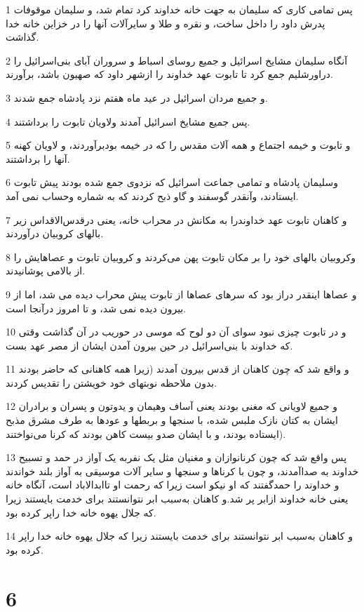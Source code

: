 \par 1 پس تمامی کاری که سلیمان به جهت خانه خداوند کرد تمام شد، و سلیمان موقوفات پدرش داود را داخل ساخت، و نقره و طلا و سایرآلات آنها را در خزاین خانه خدا گذاشت.
\par 2 آنگاه سلیمان مشایخ اسرائیل و جمیع روسای اسباط و سروران آبای بنی‌اسرائیل را دراورشلیم جمع کرد تا تابوت عهد خداوند را ازشهر داود که صهیون باشد، برآورند.
\par 3 و جمیع مردان اسرائیل در عید ماه هفتم نزد پادشاه جمع شدند.
\par 4 پس جمیع مشایخ اسرائیل آمدند ولاویان تابوت را برداشتند.
\par 5 و تابوت و خیمه اجتماع و همه آلات مقدس را که در خیمه بودبرآوردند، و لاویان کهنه آنها را برداشتند.
\par 6 وسلیمان پادشاه و تمامی جماعت اسرائیل که نزدوی جمع شده بودند پیش تابوت ایستادند، وآنقدر گوسفند و گاو ذبح کردند که به شماره وحساب نمی آمد.
\par 7 و کاهنان تابوت عهد خداوندرا به مکانش در محراب خانه، یعنی درقدس‌الاقداس زیر بالهای کروبیان درآوردند.
\par 8 وکروبیان بالهای خود را بر مکان تابوت پهن می‌کردند و کروبیان تابوت و عصاهایش را از بالامی پوشانیدند.
\par 9 و عصاها اینقدر دراز بود که سرهای عصاها از تابوت پیش محراب دیده می شد، اما از بیرون دیده نمی شد، و تا امروز درآنجا است.
\par 10 و در تابوت چیزی نبود سوای آن دو لوح که موسی در حوریب در آن گذاشت وقتی که خداوند با بنی‌اسرائیل در حین بیرون آمدن ایشان از مصر عهد بست.
\par 11 و واقع شد که چون کاهنان از قدس بیرون آمدند (زیرا همه کاهنانی که حاضر بودند بدون ملاحظه نوبتهای خود خویشتن را تقدیس کردند.
\par 12 و جمیع لاویانی که مغنی بودند یعنی آساف وهیمان و یدوتون و پسران و برادران ایشان به کتان نازک ملبس شده، با سنجها و بربطها و عودها به طرف مشرق مذبح ایستاده بودند، و با ایشان صدو بیست کاهن بودند که کرنا می‌نواختند).
\par 13 پس واقع شد که چون کرنانوازان و مغنیان مثل یک نفربه یک آواز در حمد و تسبیح خداوند به صداآمدند، و چون با کرناها و سنجها و سایر آلات موسیقی به آواز بلند خواندند و خداوند را حمدگفتند که او نیکو است زیرا که رحمت او تاابدالاباد است، آنگاه خانه یعنی خانه خداوند ازابر پر شد.و کاهنان به‌سبب ابر نتوانستند برای خدمت بایستند زیرا که جلال یهوه خانه خدا راپر کرده بود.
\par 14 و کاهنان به‌سبب ابر نتوانستند برای خدمت بایستند زیرا که جلال یهوه خانه خدا راپر کرده بود.
 
\chapter{6}

